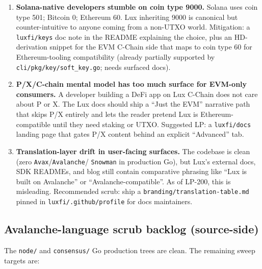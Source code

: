 \documentclass[11pt,a4paper]{article}
\begin{document}
\begin{enumerate}[leftmargin=1.4em,topsep=0.2em,itemsep=0.1em]
  \item \textbf{Solana-native developers stumble on coin type 9000.}
        Solana uses coin type 501; Bitcoin 0; Ethereum 60. Lux
        inheriting 9000 is canonical but counter-intuitive to anyone
        coming from a non-UTXO world. Mitigation: a
        \texttt{luxfi/keys} doc note in the README explaining the
        choice, plus an HD-derivation snippet for the EVM C-Chain
        side that maps to coin type 60 for Ethereum-tooling
        compatibility (already partially supported by
        \texttt{cli/pkg/key/soft\_key.go}; needs surfaced docs).
  \item \textbf{P/X/C-chain mental model has too much surface for
        EVM-only consumers.} A developer building a DeFi app on Lux
        C-Chain does not care about P or X. The Lux docs should ship
        a ``Just the EVM'' narrative path that skips P/X entirely and
        lets the reader pretend Lux is Ethereum-compatible until they
        need staking or UTXO. Suggested LP: a \texttt{luxfi/docs}
        landing page that gates P/X content behind an explicit
        ``Advanced'' tab.
  \item \textbf{Translation-layer drift in user-facing surfaces.} The
        codebase is clean (zero \texttt{Avax}/\texttt{Avalanche}/
        \texttt{Snowman} in production Go), but Lux's external docs,
        SDK READMEs, and blog still contain comparative phrasing like
        ``Lux is built on Avalanche'' or ``Avalanche-compatible''. As
        of LP-200, this is misleading. Recommended scrub: ship a
        \texttt{branding/translation-table.md} pinned in
        \texttt{luxfi/.github/profile} for docs maintainers.
\end{enumerate}

\subsection{Avalanche-language scrub backlog (source-side)}

The \texttt{node/} and \texttt{consensus/} Go production trees are
clean. The remaining sweep targets are:
\end{document}
